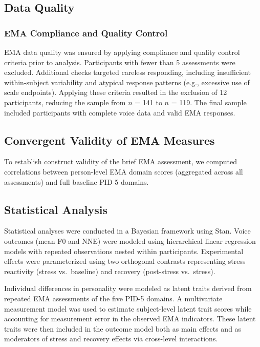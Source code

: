 \documentclass[
  english,
  man]{apa6}
\begin{document}
\subsection{Data Quality}\label{data-quality}

\subsubsection{EMA Compliance and Quality Control}\label{ema-compliance-and-quality-control}

EMA data quality was ensured by applying compliance and quality control criteria prior to analysis. Participants with fewer than 5 assessments were excluded. Additional checks targeted careless responding, including insufficient within-subject variability and atypical response patterns (e.g., excessive use of scale endpoints). Applying these criteria resulted in the exclusion of 12 participants, reducing the sample from \(n\) = 141 to \(n\) = 119. The final sample included participants with complete voice data and valid EMA responses.

\subsection{Convergent Validity of EMA Measures}\label{convergent-validity-of-ema-measures}

To establish construct validity of the brief EMA assessment, we computed correlations between person-level EMA domain scores (aggregated across all assessments) and full baseline PID-5 domains.

\subsection{Statistical Analysis}\label{statistical-analysis}

Statistical analyses were conducted in a Bayesian framework using Stan. Voice outcomes (mean F0 and NNE) were modeled using hierarchical linear regression models with repeated observations nested within participants. Experimental effects were parameterized using two orthogonal contrasts representing stress reactivity (stress vs.~baseline) and recovery (post-stress vs.~stress).

Individual differences in personality were modeled as latent traits derived from repeated EMA assessments of the five PID-5 domains. A multivariate measurement model was used to estimate subject-level latent trait scores while accounting for measurement error in the observed EMA indicators. These latent traits were then included in the outcome model both as main effects and as moderators of stress and recovery effects via cross-level interactions.
\end{document}
